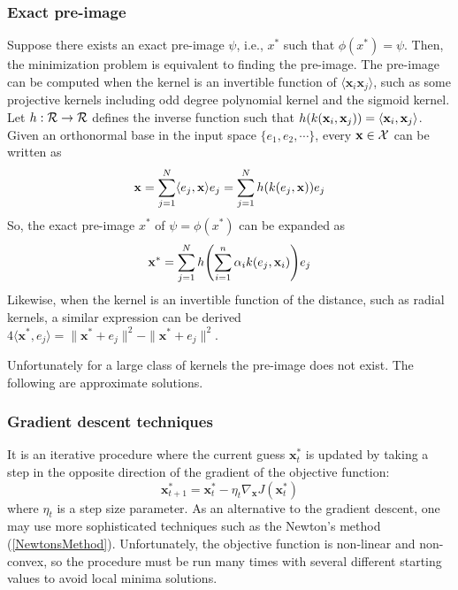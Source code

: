 \documentclass[12pt, letterpaper]{article}
\theoremstyle{definition}
\newcommand{\x}{\mathbf{x}}
\DeclarePairedDelimiter\autobracket{(}{)}
\newcommand{\br}[1]{\autobracket*{#1}}
\begin{document}
\subsubsection{Exact pre-image}
Suppose there exists an exact pre-image $\psi$, i.e., $x^*$ such that $\phi(x^*) = \psi$. Then, the minimization problem is equivalent to finding the pre-image. The pre-image can be computed when the kernel is an invertible function of $\langle \x_i \x_j \rangle$, such as some projective kernels including odd degree polynomial kernel and the sigmoid kernel. Let $h: \CMcal{R}\rightarrow \CMcal{R}$ defines the inverse function such that $h\br{k(\x_i, \x_j)} = \langle\x_i, \x_j \rangle$. Given an orthonormal base in the input space $\{e_1, e_2, \cdots\}$, every $\x \in \CMcal{X}$ can be written as 
\begin{equation}
\x = \sum_{j=1}^N\langle e_j , \x\rangle e_j = \sum_{j=1}^N h\br{k(e_j, \x)} e_j
\end{equation}
So, the exact pre-image $x^*$ of $\psi = \phi(x^*)$ can be expanded as 
\begin{equation}
\x^* =\sum_{j=1}^N h\br{\sum_{i=1}^n\alpha_i k(e_j, \x_i)} e_j
\end{equation}
Likewise, when the kernel is an invertible function of the distance, such as radial kernels, a similar expression can be derived $4 \langle \x^*, e_j \rangle = \| \x^* + e_j \|^2 -\| \x^* + e_j \|^2 $.

Unfortunately for a large class of kernels the pre-image does not exist. The following are approximate solutions.

\subsubsection{Gradient descent techniques}
It is an iterative procedure where the current guess $\x^*_t$ is updated by taking a step in the opposite direction of the gradient of the objective function:
\begin{equation}
\x^*_{t+1} = \x^*_t - \eta_t \nabla_\x J(\x_t^*)
\end{equation}
where $\eta_t$ is a step size parameter. As an alternative to the gradient descent, one may use more sophisticated techniques such as the Newton's method (\ref{NewtonsMethod}). Unfortunately, the objective function is non-linear and non-convex, so the procedure must be run many times with several different starting values to avoid local minima solutions.
\end{document}
